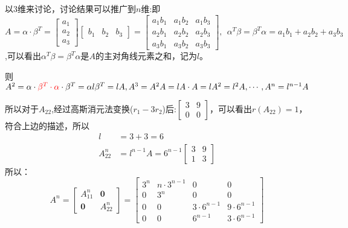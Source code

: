 \documentclass{article}
\begin{document}
\begin{jie}
{{以$3$维来讨论，讨论结果可以推广到$n$维:即$A=\alpha\cdot\beta^T=
\begin{bmatrix}
a_1\\ a_2\\a_3
\end{bmatrix}
\begin{bmatrix}
b_1& b_2&b_3
\end{bmatrix}=
\begin{bmatrix}
  a_1b_1 & a_1b_2 & a_1b_3 \\
  a_2b_1 & a_2b_2 & a_2b_3 \\
  a_3b_1 & a_3b_2 & a_3b_3 
\end{bmatrix},~~\alpha^T\beta=\beta^T\alpha=a_1b_1+a_2b_2+a_3b_3
$,可以看出$\alpha^T\beta=\beta^T\alpha$是$A$的主对角线元素之和，记为$l$。

则$A^2=\alpha\cdot\textcolor[rgb]{1.00,0.00,0.00}{\beta^T\cdot\alpha}\cdot\beta^T=\alpha l \beta^T=lA,A^3=A^2A=lA\cdot A=lA^2=l^2A,\cdots,A^n=l^{n-1}A$
}}

所以对于$A_{22}$,经过高斯消元法变换($r_{1}-3r_{2}$)后:$
\begin{bmatrix}
  3 & 9 \\
  0 & 0
\end{bmatrix}
$，可以看出$r(A_{22})=1$，符合上边的描述，所以
\begin{align*}
 l&=3+3=6\\
 A_{22}^{n}&=l^{n-1}A=6^{n-1}
 \begin{bmatrix}
   3 & 9 \\
   1 & 3
 \end{bmatrix}
\end{align*}
所以：
\begin{equation*}
  A^{n}=
\begin{bmatrix}
  A_{11}^{n} & \mathbf{0} \\
  \mathbf{0} & A_{22}^{n}
\end{bmatrix}=
\begin{bmatrix}
  3^{n} & n\cdot3^{n-1}&0&0 \\
  0 & 3^{n}&0&0\\
  0&0&3\cdot6^{n-1}&9\cdot6^{n-1}\\
  0&0&6^{n-1}&3\cdot6^{n-1}
\end{bmatrix}
\end{equation*}
\end{jie}
\end{document}
